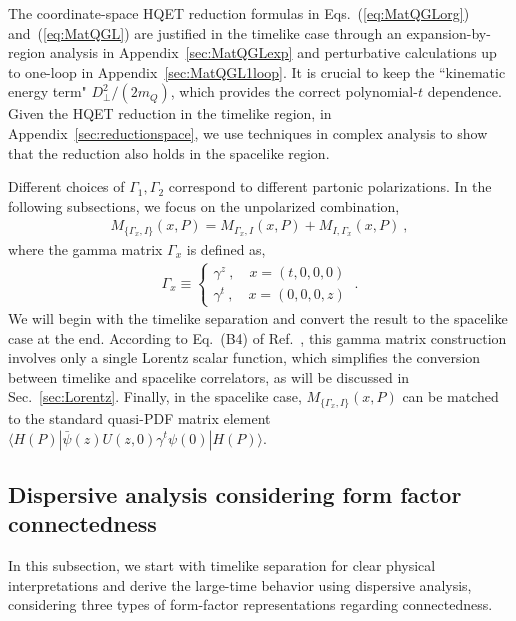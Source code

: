 \documentclass[a4paper,11pt]{article}
\begin{document}
The coordinate-space HQET reduction formulas in Eqs.~(\ref{eq:MatQGLorg}) and~(\ref{eq:MatQGL}) are justified in the timelike case through an expansion-by-region analysis in Appendix~\ref{sec:MatQGLexp} and perturbative calculations up to one-loop in Appendix~\ref{sec:MatQGL1loop}. It is crucial to keep the ``kinematic energy term" $D_{\perp}^2/(2 m_Q)$, which provides the correct polynomial-$t$ dependence. Given the HQET reduction in the timelike region, in Appendix~\ref{sec:reductionspace}, we use techniques in complex analysis to show that the reduction also holds in the spacelike region.

Different choices of $\Gamma_1,\Gamma_2$ correspond to different partonic polarizations. In the following subsections, we focus on the unpolarized combination, 
\begin{align}
M_{\{\Gamma_x,I\}}(x,P) = M_{\Gamma_x,I}(x,P)+M_{I,\Gamma_x}(x,P) \ ,
\end{align}
where the gamma matrix $\Gamma_x$ is defined as,
\begin{align}
\Gamma_x \equiv 
\begin{cases}\label{eq:Gammax}
\gamma^z \ , \quad x=(t,0,0,0) \\
\gamma^t \ , \quad x=(0,0,0,z)
\end{cases} \ .
\end{align}
We will begin with the timelike separation and convert the result to the spacelike case at the end. According to Eq.~(B4) of Ref.~\cite{Gao:2021dbh}, this gamma matrix construction involves only a single Lorentz scalar function, which simplifies the conversion between timelike and spacelike correlators, as will be discussed in Sec.~\ref{sec:Lorentz}. Finally, in the spacelike case, $M_{\{\Gamma_x,I\}}(x,P)$ can be matched to the standard quasi-PDF matrix element $\langle H(P) | \bar{\psi}(z) U(z,0) \gamma^t \psi(0) | H(P) \rangle$.  


\subsection{Dispersive analysis considering form factor connectedness}\label{sec:Disana}
In this subsection, we start with timelike separation for clear physical interpretations and derive the large-time behavior using dispersive analysis, considering three types of form-factor representations regarding connectedness. 
\end{document}
